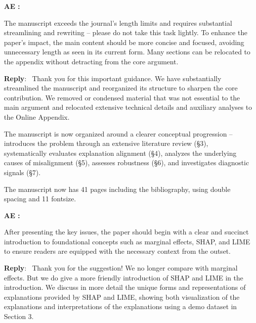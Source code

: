 \documentclass[11pt]{article}
\newcounter{se}[section]
\newcounter{aed}[section]
\newenvironment{aed}[1][]{%
    \refstepcounter{aed}\par\medskip\noindent%
    \textbf{AE \theaed: #1}\rmfamily\itshape%
}{\medskip}
\newenvironment{reply}
 {\par\medskip \noindent \begin{sf}\textbf{Reply}:\ }
 {\medskip \end{sf}}
\begin{document}
\begin{aed}
The manuscript exceeds the journal's length limits and requires substantial streamlining and rewriting – please do not take this task lightly. To enhance the paper's impact, the main content should be more concise and focused, avoiding unnecessary length as seen in its
current form. Many sections can be relocated to the appendix without detracting from the core argument.
\end{aed}
\begin{reply}
Thank you for this important guidance. We have substantially streamlined the manuscript and reorganized its structure to sharpen the core contribution. We removed or condensed material that was not essential to the main argument and relocated extensive technical details and auxiliary analyses to the Online Appendix.

The manuscript is now organized around a clearer conceptual progression -- introduces the problem through an extensive literature review (\S 3), systematically evaluates explanation alignment (\S 4), analyzes the underlying causes of misalignment (\S 5), assesses robustness (\S 6), and investigates diagnostic signals (\S 7).

The manuscript now has 41 pages including the bibliography, using double spacing and 11 fontsize.
\end{reply}


\begin{aed}
    After presenting the key issues, the paper should begin with a clear and succinct introduction to foundational concepts such as marginal effects, SHAP, and LIME to ensure readers are equipped with the necessary context from the outset.
\end{aed}

\begin{reply}
    Thank you for the suggestion! We no longer compare with marginal effects. But we do give a more friendly introduction of SHAP and LIME in the introduction. We discuss in more detail the unique forms and representations of explanations provided by SHAP and LIME, showing both visualization of the explanations and interpretations of the explanations using a demo dataset in Section 3. 
\end{reply}
\end{document}
